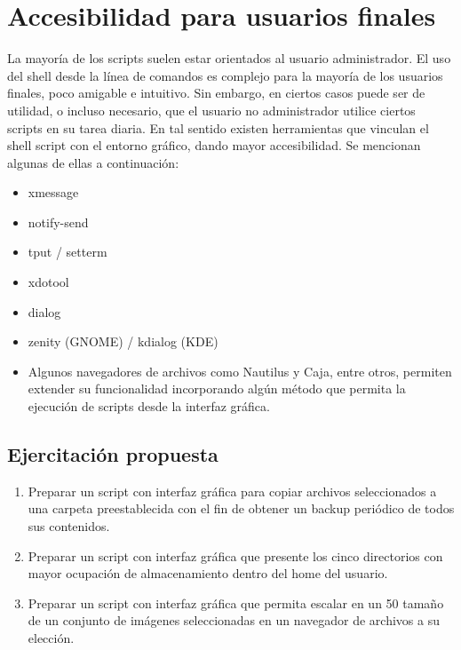 \section{Accesibilidad para usuarios finales}\label{ref:acces}

La mayoría de los scripts suelen estar orientados al usuario administrador. El uso del shell desde la línea de 
comandos es complejo para la mayoría de los usuarios finales, poco amigable e intuitivo. Sin embargo, en 
ciertos casos puede ser de utilidad, o incluso necesario, que el usuario no administrador utilice ciertos scripts en su tarea diaria. En tal sentido existen herramientas que vinculan el shell script con el entorno gráfico, dando mayor accesibilidad. Se mencionan algunas de ellas a continuación: 

\begin{itemize}
\item xmessage   
\item notify-send 
\item tput / setterm  
\item xdotool
\item dialog 
\item zenity (GNOME) / kdialog (KDE)
\item Algunos navegadores de archivos como Nautilus y Caja, entre otros, permiten extender su funcionalidad incorporando algún método que permita la ejecución de scripts desde la interfaz gráfica. 
\end{itemize}

\subsection{Ejercitación propuesta}
\begin{enumerate}
	\item 
Preparar un script con interfaz gráfica para copiar archivos seleccionados a una carpeta preestablecida con el fin de obtener un backup periódico de todos sus contenidos.
	\item 
Preparar un script con interfaz gráfica que presente los cinco directorios con mayor ocupación de almacenamiento dentro del home del usuario.
	\item 
Preparar un script con interfaz gráfica que permita escalar en un 50%
tamaño de un conjunto de imágenes seleccionadas en un navegador de archivos
a su elección. 
\end{enumerate}
